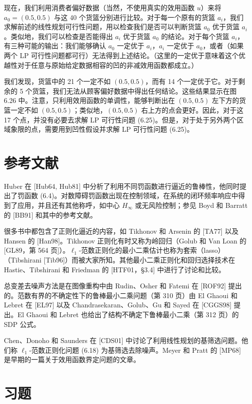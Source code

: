 \documentclass[UTF8, 12pt, fontset=fandol, oneside]{ctexart}
\begin{document}
现在，我们利用消费者偏好数据（当然，不使用真实的效用函数 $u$）来将 $a_0=(0.5,0.5)$ 与这 40 个货篮分别进行比较。对于每一个原有的货篮 $a_i$，我们求解前述的线性规划可行性问题，用以检查我们是否可以判断货篮 $a_0$ 优于货篮 $a_i$。类似地，我们可以检查是否能得出 $a_i$ 优于货篮 $a_0$ 的结论。对于每个货篮 $a_i$，有三种可能的输出：我们能够确认 $a_0$ 一定优于 $a_i$，$a_i$ 一定优于 $a_0$，或者（如果两个 LP 可行性问题都可行）无法得到上述结论。（这里的一定优于意味着这个优越性对于任意与原始给定数据相容的凹的非减效用函数都成立。）

我们发现，货篮中的 21 个一定不如 $(0.5,0.5)$，而有 14 个一定优于它。对于剩余的 5 个货篮，我们无法从顾客偏好数据中得出任何结论。这些结果显示在图 6.26 中。注意，只利用效用函数的单调性，能够判断出在 $(0.5,0.5)$ 左下方的货篮一定不如 $(0.5,0.5)$；类似地，$(0.5,0.5)$ 右上方的点会更好。因此，对于这 17 个点，并没有必要去求解 LP 可行性问题 (6.25)。但是，对于处于另外两个区域象限的点，需要用到凹性假设并求解 LP 可行性问题 (6.25)。

\section*{参考文献}

Huber 在 [Hub64, Hub81] 中分析了利用不同罚函数进行逼近的鲁棒性，他同时提出了罚函数 (6.4)。对数障碍罚函数出现在控制领域，在系统的闭环频率响应中得到了应用，并且还有其他称呼，如中心 $H_\infty$ 或无风险控制；参见 Boyd 和 Barratt 的 [BB91] 和其中的参考文献。

很多书中都包含了正则化逼近的内容，如 Tikhonov 和 Arsenin 的 [TA77] 以及 Hansen 的 [Han98]。Tikhonov 正则化有时又称为岭回归（Golub 和 Van Loan 的 [GL89，第 564 页]）。$\ell_1$-范数正则化的最小二乘估计也称为套索（lasso）（Tibshirani [Tib96]）而被大家所知。其他最小二乘正则化和回归选择技术在 Hastie、Tibshirani 和 Friedman 的 [HTF01，\S3.4] 中进行了讨论和比较。

总变差去噪声方法是在图像重构中由 Rudin、Osher 和 Fatemi 在 [ROF92] 提出的。范数有界的不确定性下的鲁棒最小二乘问题（第 310 页）由 El Ghaoui 和 Lebret 在 [EL97] 以及 Chandrasekaran、Golub、Gu 和 Sayed 在 [CGGS98] 提出。El Ghaoui 和 Lebret 也给出了结构不确定下鲁棒最小二乘（第 312 页）的 SDP 公式。

Chen、Donoho 和 Saunders 在 [CDS01] 中讨论了利用线性规划的基筛选问题。他们称 $\ell_1$-范数正则化问题 (6.18) 为基筛选去除噪声。Meyer 和 Pratt 的 [MP68] 是早期的一篇关于效用函数界定问题的文章。

\section*{习题}
\end{document}
